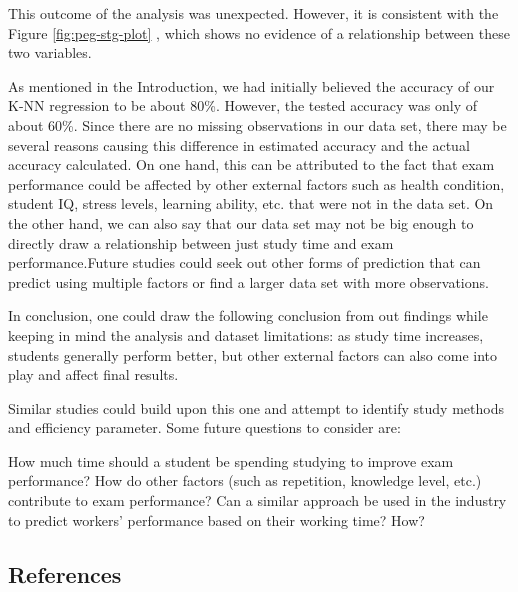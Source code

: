 \documentclass[
]{article}
\begin{document}
This outcome of the analysis was unexpected. However, it is consistent with the Figure \ref{fig:peg-stg-plot} , which shows no evidence of a relationship between these two variables.

As mentioned in the Introduction, we had initially believed the accuracy of our K-NN regression to be about 80\%. However, the tested accuracy was only of about 60\%. Since there are no missing observations in our data set, there may be several reasons causing this difference in estimated accuracy and the actual accuracy calculated. On one hand, this can be attributed to the fact that exam performance could be affected by other external factors such as health condition, student IQ, stress levels, learning ability, etc. that were not in the data set. On the other hand, we can also say that our data set may not be big enough to directly draw a relationship between just study time and exam performance.Future studies could seek out other forms of prediction that can predict using multiple factors or find a larger data set with more observations.

In conclusion, one could draw the following conclusion from out findings while keeping in mind the analysis and dataset limitations: as study time increases, students generally perform better, but other external factors can also come into play and affect final results.

Similar studies could build upon this one and attempt to identify study methods and efficiency parameter. Some future questions to consider are:

How much time should a student be spending studying to improve exam performance?
How do other factors (such as repetition, knowledge level, etc.) contribute to exam performance?
Can a similar approach be used in the industry to predict workers' performance based on their working time? How?

\hypertarget{references}{%
\subsection*{References}\label{references}}
\end{document}
